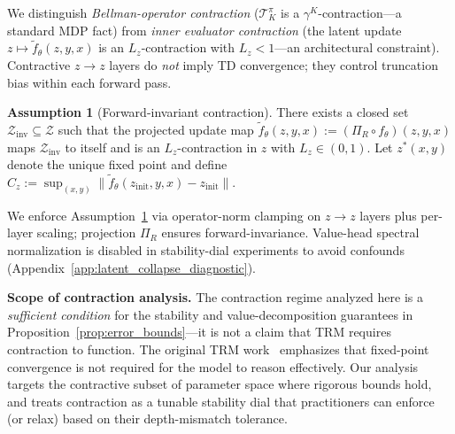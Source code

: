 \documentclass{article}
\theoremstyle{plain}
\theoremstyle{definition}
\newtheorem{assumption}[theorem]{Assumption}
\theoremstyle{remark}
\newcommand{\shortonly}[1]{#1}
\newcommand{\shortonly}[1]{}
\newcommand{\ZZ}{\mathcal{Z}}
\begin{document}
\shortonly{
We distinguish \emph{Bellman-operator contraction} ($\mathcal{T}^\pi_K$ is a $\gamma^K$-contraction---a standard MDP fact) from \emph{inner evaluator contraction} (the latent update $z\mapsto \tilde f_\theta(z,y,x)$ is an $L_z$-contraction with $L_z<1$---an architectural constraint).
Contractive $z\!\to\!z$ layers do \emph{not} imply TD convergence; they control truncation bias within each forward pass.

\begin{assumption}[Forward-invariant contraction]
\label{ass:Lip}
There exists a closed set $\mathcal{Z}_{\mathrm{inv}}\subseteq\ZZ$ such that the projected update map $\tilde f_\theta(z,y,x):=(\Pi_R\circ f_\theta)(z,y,x)$ maps $\mathcal{Z}_{\mathrm{inv}}$ to itself and is an $L_z$-contraction in $z$ with $L_z\in(0,1)$.
Let $z^*(x,y)$ denote the unique fixed point and define $C_z:=\sup_{(x,y)}\|\tilde f_\theta(z_{\mathrm{init}},y,x)-z_{\mathrm{init}}\|$.
\end{assumption}

We enforce Assumption~\ref{ass:Lip} via operator-norm clamping on $z\!\to\!z$ layers plus per-layer scaling; projection $\Pi_R$ ensures forward-invariance.
Value-head spectral normalization is disabled in stability-dial experiments to avoid confounds (Appendix~\ref{app:latent_collapse_diagnostic}).

\textbf{Scope of contraction analysis.}
The contraction regime analyzed here is a \emph{sufficient condition} for the stability and value-decomposition guarantees in Proposition~\ref{prop:error_bounds}---it is not a claim that TRM requires contraction to function.
The original TRM work~\citep{TRM2025} emphasizes that fixed-point convergence is not required for the model to reason effectively.
Our analysis targets the contractive subset of parameter space where rigorous bounds hold, and treats contraction as a tunable stability dial that practitioners can enforce (or relax) based on their depth-mismatch tolerance.}
\end{document}

